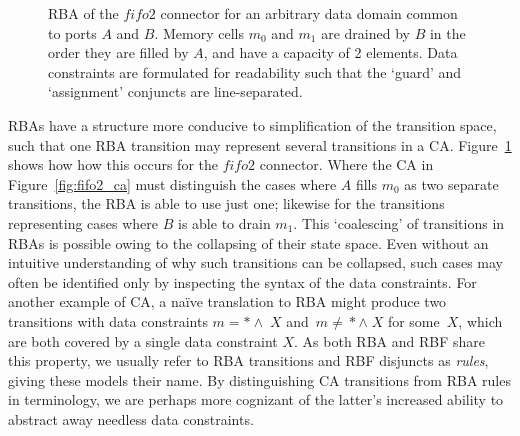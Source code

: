 \begin{figure}[ht]
	\centering
	\caption[RBA for fifo2 connector.]{RBA of the $fifo2$ connector for an arbitrary data domain common to ports $A$ and $B$. Memory cells $m_0$ and $m_1$ are drained by $B$ in the order they are filled by $A$, and have a capacity of 2 elements. Data constraints are formulated for readability such that the `guard' and `assignment' conjuncts are line-separated.}
	\label{fig:fifo2_rba}
\end{figure}


RBAs have a structure more conducive to simplification of the transition space, such that one RBA transition may represent several transitions in a CA. Figure~\ref{fig:fifo2_rba} shows how how this occurs for the $fifo2$ connector. Where the CA in Figure~\ref{fig:fifo2_ca} must distinguish the cases where $A$ fills $m_0$ as two separate transitions, the RBA is able to use just one; likewise for the transitions representing cases where $B$ is able to drain $m_1$. This `coalescing' of transitions in RBAs is possible owing to the collapsing of their state space. Even without an intuitive understanding of why such transitions can be collapsed, such cases may often be identified only by inspecting the syntax of the data constraints. For another example of CA, a na{\"i}ve translation to RBA might produce two transitions with data constraints $m=*\wedge{}\;X$ and~$m\neq{}*\wedge{}\;X$ for some~$X$, which are both covered by a single data constraint $X$. As both RBA and RBF share this property, we usually refer to RBA transitions and RBF disjuncts as \textit{rules}, giving these models their name. By distinguishing CA transitions from RBA rules in terminology, we are perhaps more cognizant of the latter's increased ability to abstract away needless data constraints. 

